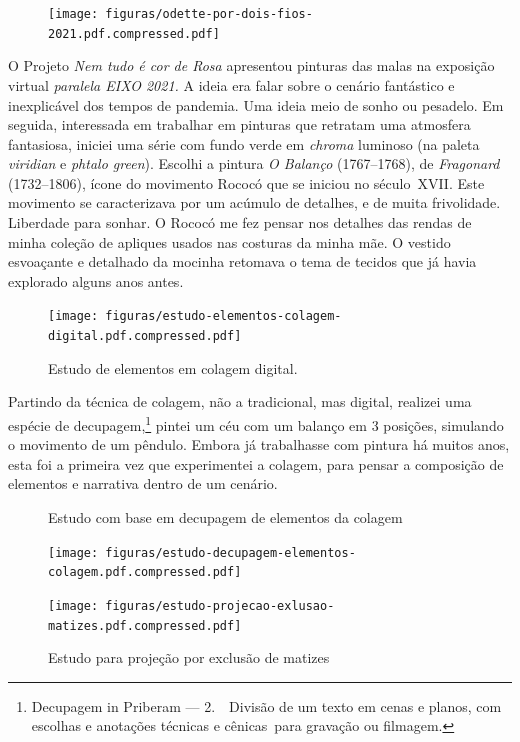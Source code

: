 \begin{figure}
  \flushright
  \begin{minipage}{3.28742in}
	\caption{}

  \texttt{[image: figuras/odette-por-dois-fios-2021.pdf.compressed.pdf]}
\end{minipage}
\end{figure}

O Projeto \emph{Nem tudo é cor de Rosa} apresentou pinturas das malas
na exposição virtual \emph{paralela EIXO 2021.} A ideia era falar sobre
o cenário fantástico e inexplicável dos tempos de pandemia. Uma ideia
meio de sonho ou pesadelo. Em seguida, interessada em trabalhar em
pinturas que retratam uma atmosfera fantasiosa, iniciei uma série com
fundo verde em \emph{chroma} luminoso (na paleta \emph{viridian} e
\emph{phtalo green}). Escolhi a pintura \emph{O Balanço} (1767--1768),
de \emph{Fragonard} (1732--1806), ícone do movimento Rococó que se
iniciou no século~XVII\@. Este movimento se caracterizava por um
acúmulo de detalhes, e de muita frivolidade. Liberdade para sonhar. O
Rococó me fez pensar nos detalhes das rendas de minha coleção de
apliques usados nas costuras da minha mãe. O vestido esvoaçante e
detalhado da mocinha retomava o tema de tecidos que já havia explorado
alguns anos antes.

\begin{figure}[b]
	\caption{Estudo de elementos em colagem digital.}

	\texttt{[image: figuras/estudo-elementos-colagem-digital.pdf.compressed.pdf]}
\end{figure}

Partindo da técnica de colagem, não a tradicional, mas digital,
realizei uma espécie de decupagem,\footnote{Decupagem in Priberam ---
	2.~~Divisão de um texto em cenas e planos,
	com escolhas e anotações técnicas e cênicas~para gravação ou filmagem.}
pintei um céu com um balanço em 3 posições, simulando o movimento de um
pêndulo. Embora já trabalhasse com pintura há muitos anos, esta foi a
primeira vez que experimentei a colagem, para pensar a composição de
elementos e narrativa dentro de um cenário.

\begin{figure}
  \begin{minipage}{.45\linewidth}
	\caption{Estudo com base em decupagem de elementos da colagem}

	\texttt{[image: figuras/estudo-decupagem-elementos-colagem.pdf.compressed.pdf]}
\end{minipage}\hfill
\begin{minipage}{.45\linewidth}
  \caption{Estudo para projeção por exclusão de matizes \phantom{aaaaaaaaaaaaaaa}}
	\texttt{[image: figuras/estudo-projecao-exlusao-matizes.pdf.compressed.pdf]}

\end{minipage}
\end{figure}

